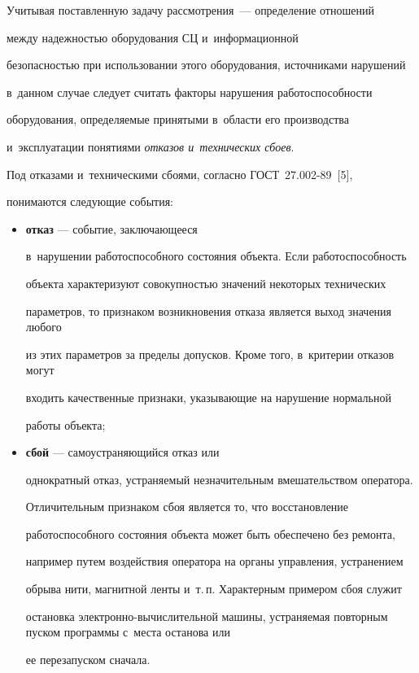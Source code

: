   

  Учитывая поставленную задачу рассмотрения~--- определение отношений 

между надежностью оборудования СЦ и~информационной 

безопасностью при использовании этого оборудования, источниками нарушений 

в~данном случае следует считать факторы нарушения работоспособности 

оборудования, определяемые принятыми в~об\-ласти его производства 

и~эксплуатации понятиями \textit{отказов и~технических сбоев}. 

  

  Под отказами и~техническими сбоями, согласно ГОСТ~27.002-89~[5], 

понимаются следующие события:

  \begin{itemize}

  \item[\ ] \textbf{отказ} --- событие, заключающееся 

в~нарушении работоспособного состояния объекта. Если работоспособность 

объекта характеризуют совокупностью значений некоторых технических 

параметров, то признаком возникновения отказа является выход значения любого 

из этих параметров за пределы допусков. Кроме того, в~критерии отказов могут 

входить качественные признаки, указывающие на нарушение нормальной 

работы объекта; 

  \item[\ ] \textbf{сбой} --- самоустраняющийся отказ или 

однократный отказ, устраняемый незначительным вмешательством оператора. 

Отличительным признаком сбоя является то, что восстановление 

работоспособного состояния объекта может быть обеспечено без ремонта, 

например путем воздействия оператора на органы управления, устранением 

обрыва нити, магнитной ленты и~т.\,п. Характерным примером сбоя служит 

остановка элек\-т\-рон\-но-вы\-чис\-ли\-тель\-ной машины, устраняемая повторным пуском программы с~места останова или 

ее перезапуском сначала.

  \end{itemize}

